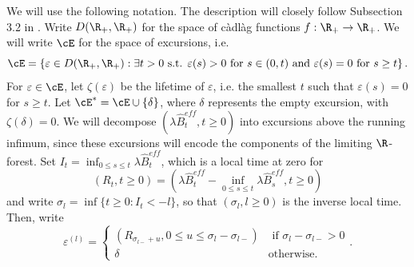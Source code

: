 We will use the following notation. The description will closely follow Subsection 3.2 in \cite{Conchon2018}. Write $D(\R_+,\R_+)$ for the space of c\`adl\`ag functions $f:\R_+\to \R_+$. We will write $\cE$ for the space of excursions, i.e.
$$\cE=\left\{\varepsilon \in D(\R_+,\R_+):\exists t>0\text{ s.t. }\varepsilon(s)>0\text{ for }s\in (0,t)\text{ and }\varepsilon(s)=0\text{ for }s\geq t\right\}.$$
For $\varepsilon\in \cE$, let $\zeta(\varepsilon)$ be the lifetime of $\varepsilon$, i.e. the smallest $t$ such that $\varepsilon(s)=0$ for $s\geq t$. Let $\cE^*=\cE\cup\{\delta\}$, where $\delta$ represents the empty excursion, with $\zeta(\delta)=0$. We will decompose $(\lambda \hat{B}^{eff}_t,t\geq 0)$ into excursions above the running infimum, since these excursions will encode the components of the limiting $\R$-forest. Set $I_t=\inf_{0\leq s\leq t}\lambda \hat{B}_t^{eff}$, which is a local time at zero for 
$$(R_t,t\geq 0)=\left(\lambda \hat{B}_t^{eff}-\inf_{0\leq s \leq t}\lambda \hat{B}_s^{eff},t\geq 0\right)$$  and write $\sigma _l=\inf\{t\geq 0: I_t<-l\}$, so that $(\sigma_l, l\geq 0)$ is the inverse local time. Then, write 
$$\varepsilon^{(l)}=\begin{cases}(R_{\sigma_{l-}+u}, 0\leq u \leq \sigma_l-\sigma_{l-})&\text{ if }\sigma_l-\sigma_{l-}>0\\ \delta &\text{otherwise.}\end{cases}.$$

